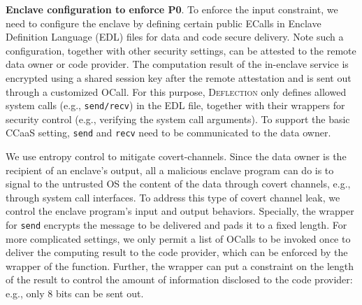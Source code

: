 \vspace{3pt}\noindent\textbf{Enclave configuration to enforce P0}. 
To enforce the input constraint, we need to configure the enclave by defining certain public ECalls in Enclave Definition Language (EDL) files for data and code secure delivery. Note such a configuration, together with other security settings, can be attested to the remote data owner or code provider. The computation result of the in-enclave service is encrypted using a shared session key after the remote attestation and is sent out through a customized OCall. For this purpose, \textsc{Deflection} only defines allowed system calls (e.g., \texttt{send/recv}) in the EDL file, together with their wrappers for security control (e.g., verifying the system call arguments).
To support the basic CCaaS setting,  \texttt{send} and \texttt{recv} need to be communicated to the data owner. 

We use entropy control to mitigate covert-channels. Since the data owner is the recipient of an enclave’s output, all a malicious enclave program can do is to signal to the untrusted OS the content of the data through covert channels, e.g., through system call interfaces. To address this type of covert channel leak, we control the enclave program’s input and output behaviors. Specially, the wrapper for \texttt{send} encrypts the message to be delivered and pads it to a fixed length. For more complicated settings, we only permit a list of OCalls to be invoked once to deliver the computing result to the code provider, which can be enforced by the wrapper of the function. Further, the wrapper can put a constraint on the length of the result to control the amount of information disclosed to the code provider: e.g., only 8 bits can be sent out.


